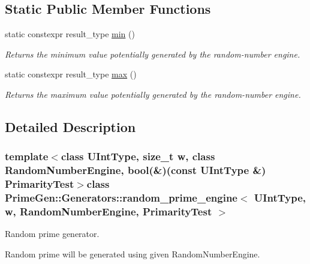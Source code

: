 \subsection*{Static Public Member Functions}
\begin{DoxyCompactItemize}
\item 
static constexpr result\+\_\+type \hyperlink{class_prime_gen_1_1_generators_1_1random__prime__engine_aca7cba717ac90823ba325c6e4d79d1a2}{min} ()
\begin{DoxyCompactList}\small\item\em Returns the minimum value potentially generated by the random-\/number engine. \end{DoxyCompactList}\item 
static constexpr result\+\_\+type \hyperlink{class_prime_gen_1_1_generators_1_1random__prime__engine_a123bf5e419910ff9b04916408fbdd228}{max} ()
\begin{DoxyCompactList}\small\item\em Returns the maximum value potentially generated by the random-\/number engine. \end{DoxyCompactList}\end{DoxyCompactItemize}


\subsection{Detailed Description}
\subsubsection*{template$<$class U\+Int\+Type, size\+\_\+t w, class Random\+Number\+Engine, bool(\&)(const U\+Int\+Type \&) Primarity\+Test$>$class Prime\+Gen\+::\+Generators\+::random\+\_\+prime\+\_\+engine$<$ U\+Int\+Type, w, Random\+Number\+Engine, Primarity\+Test $>$}

Random prime generator. 

Random prime will be generated using given {\ttfamily Random\+Number\+Engine}.


